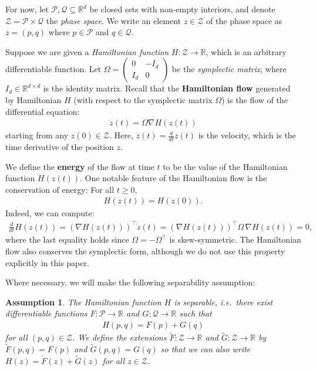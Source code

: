 \documentclass[11pt]{article}
\newtheorem{assumption}{Assumption}
\renewcommand{\P}{\mathcal{P}}
\newcommand{\R}{\mathbb{R}}
\newcommand{\Z}{\mathcal{Z}}
\newcommand{\Q}{\mathcal{Q}}
\begin{document}
For now, let $\P, \Q \subseteq \R^d$ be closed sets with non-empty interiors, and denote $\Z = \P \times \Q$ the {\em phase space}.
We write an element $z \in \Z$ of the phase space as $z = (p,q)$ where $p \in \P$ and $q \in \Q$. 

Suppose we are given a {\em Hamiltonian function} $H \colon \Z \to \R$, which is an arbitrary differentiable function. Let $\Omega = \begin{pmatrix}
    0 & -I_d \\ I_d & 0
\end{pmatrix}$ be the {\em symplectic matrix},
where $I_d \in \R^{d \times d}$ is the identity matrix. Recall that the {\bf Hamiltonian flow} generated by Hamiltonian $H$ (with respect to the symplectic matrix $\Omega$) is the flow of the differential equation:
\begin{align}\label{Eq:HF}
    \dot z(t) = \Omega \nabla H(z(t))
\end{align}
starting from any $z(0) \in \Z$.
Here, $\dot z(t) = \frac{d}{dt} z(t)$ is the velocity, which is the time derivative of the position $z$.

We define the {\bf energy} of the flow at time $t$ to be the value of the Hamiltonian function $H(z(t))$.
One notable feature of the Hamiltonian flow is the conservation of energy:
For all $t \ge 0$,
\begin{align*}
    H(z(t)) = H(z(0)).
\end{align*}
Indeed, we can compute:
\begin{align*}
    \tfrac{d}{dt} H(z(t)) =\left(\nabla H(z(t))\right)^{\top}\dot z(t) = \left(\nabla H(z(t))\right)^{\top}\Omega \, \nabla H(z(t)) = 0,
\end{align*}
where the last equality holds since $\Omega = -\Omega^\top$ is skew-symmetric.
The Hamiltonian flow also conserves the symplectic form, although we do not use this property explicitly in this paper.

Where necessary, we will make the following separability assumption:

\begin{assumption}\label{Assm:Separable}
    The Hamiltonian function $H$ is separable, i.e.\ there exist differentiable functions $F \colon \P \to \R$ and $G \colon \Q \to \R$ such that
    \begin{align*}
        H(p,q) = F(p) + G(q)
    \end{align*}
    for all $(p,q) \in \Z$.
    We define the extensions $\widetilde{F} \colon \Z \to \R$ and $\widetilde{G} \colon \Z \to \R$ by $\widetilde{F}(p,q) = F(p)$ and $\widetilde{G}(p,q) = G(q)$ so that we can also write $H(z) = \widetilde{F}(z) + \widetilde{G}(z)$ for all $z \in \Z$.
\end{assumption} 
\end{document}
